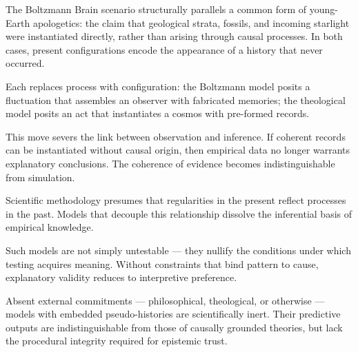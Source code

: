 \begin{commentary}
The Boltzmann Brain scenario structurally parallels a common form of young-Earth apologetics: the claim that geological strata, fossils, and incoming starlight were instantiated directly, rather than arising through causal processes. In both cases, present configurations encode the appearance of a history that never occurred.

Each replaces process with configuration: the Boltzmann model posits a fluctuation that assembles an observer with fabricated memories; the theological model posits an act that instantiates a cosmos with pre-formed records.

This move severs the link between observation and inference. If coherent records can be instantiated without causal origin, then empirical data no longer warrants explanatory conclusions. The coherence of evidence becomes indistinguishable from simulation.

Scientific methodology presumes that regularities in the present reflect processes in the past. Models that decouple this relationship dissolve the inferential basis of empirical knowledge.

Such models are not simply untestable — they nullify the conditions under which testing acquires meaning. Without constraints that bind pattern to cause, explanatory validity reduces to interpretive preference.

Absent external commitments — philosophical, theological, or otherwise — models with embedded pseudo-histories are scientifically inert. Their predictive outputs are indistinguishable from those of causally grounded theories, but lack the procedural integrity required for epistemic trust.
\end{commentary}


